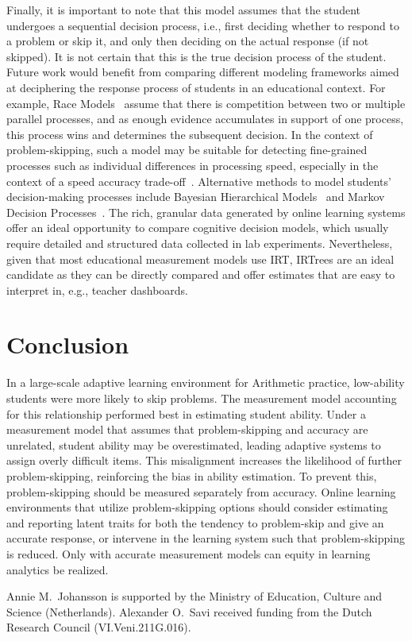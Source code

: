 \documentclass[manuscript]{acmart}
\begin{document}
Finally, it is important to note that this model assumes that the student undergoes a sequential decision process, i.e., first deciding whether to respond to a problem or skip it, and only then deciding on the actual response (if not skipped). It is not certain that this is the true decision process of the student. Future work would benefit from comparing different modeling frameworks aimed at deciphering the response process of students in an educational context. For example, Race Models~\cite{heathcote2022winner} assume that there is competition between two or multiple parallel processes, and as enough evidence accumulates in support of one process, this process wins and determines the subsequent decision. In the context of problem-skipping, such a model may be suitable for detecting fine-grained processes such as individual differences in processing speed, especially in the context of a speed accuracy trade-off~\cite{heathcote2022winner, evans2018modeling}. Alternative methods to model students' decision-making processes include Bayesian Hierarchical Models~\cite{sawyer2018modeling, lee2014bayesian} and Markov Decision Processes~\cite{lamar2018markov, puterman1994markov}. The rich, granular data generated by online learning systems offer an ideal opportunity to compare cognitive decision models, which usually require detailed and structured data collected in lab experiments. Nevertheless, given that most educational measurement models use IRT, IRTrees are an ideal candidate as they can be directly compared and offer estimates that are easy to interpret in, e.g., teacher dashboards.

\section{Conclusion}
In a large-scale adaptive learning environment for Arithmetic practice, low-ability students were more likely to skip problems. The measurement model accounting for this relationship performed best in estimating student ability. Under a measurement model that assumes that problem-skipping and accuracy are unrelated, student ability may be overestimated, leading adaptive systems to assign overly difficult items. This misalignment increases the likelihood of further problem-skipping, reinforcing the bias in ability estimation. To prevent this, problem-skipping should be measured separately from accuracy. Online learning environments that utilize problem-skipping options should consider estimating and reporting latent traits for both the tendency to problem-skip and give an accurate response, or intervene in the learning system such that problem-skipping is reduced. Only with accurate measurement models can equity in learning analytics be realized. 

\begin{acks}
    Annie M.\ Johansson is supported by the Ministry of Education, Culture and Science (Netherlands). Alexander O.\ Savi received funding from the Dutch Research Council (VI.Veni.211G.016).
\end{acks}




\end{document}
